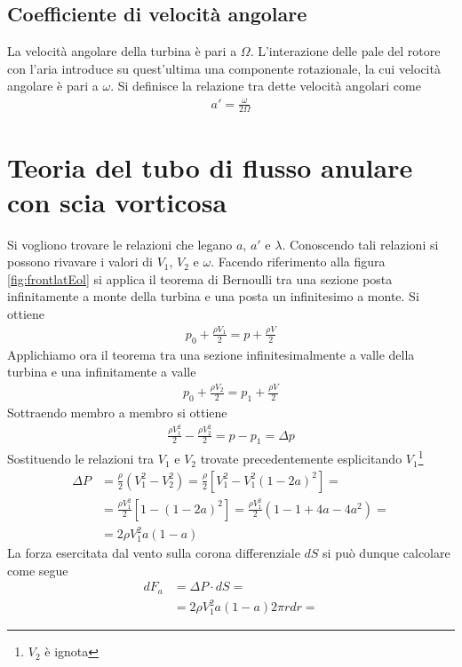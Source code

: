 \subsection{Coefficiente di velocità angolare}
La velocità angolare della turbina è pari a $\Omega$. L'interazione delle pale del rotore con l'aria introduce su quest'ultima una componente rotazionale, la cui velocità angolare è pari a $\omega$. Si definisce la relazione tra dette velocità angolari come 
\begin{align*}
a' = \frac{\omega}{2 \Omega}
\end{align*}

\section{Teoria del tubo di flusso anulare con scia vorticosa}
Si vogliono trovare le relazioni che legano $a$, $a'$ e $\lambda$. Conoscendo tali relazioni si possono rivavare i valori di $V_1$, $V_2$ e $\omega$. 
Facendo riferimento alla figura \ref{fig:frontlatEol} si applica il teorema di Bernoulli tra una sezione posta infinitamente a monte della turbina e una posta un infinitesimo a monte. Si ottiene
\begin{align*}
p_0 + \frac{\rho V_1}{2} = p + \frac{\rho V}{2}
\end{align*}
Applichiamo ora il teorema tra una sezione infinitesimalmente a valle della turbina e una infinitamente a valle\\
\begin{align*}
p_0 + \frac{\rho V_2}{2} = p_1 + \frac{\rho V}{2}
\end{align*}
Sottraendo membro a membro si ottiene
\begin{align*}
\frac{\rho V_1^2}{2} - \frac{\rho V_2^2}{2} = p - p_1 = \Delta p
\end{align*}
Sostituendo le relazioni tra $V_1$ e $V_2$ trovate precedentemente esplicitando $V_1$\footnote{$V_2$ è ignota}
\begin{align*}
\Delta P &= \frac{\rho}{2} \left(V_1^2 - V_2^2 \right) = \frac{\rho}{2} \left[ V_1^2 - V_1^2 \left(1-2a \right)^2 \right]=\\
&= \frac{\rho V_1^2}{2} \left[ 1- \left( 1- 2a \right)^2 \right] = \frac{\rho V_1^2}{2} \left( 1- 1+4a-4a^2 \right)=\\
&= 2 \rho V_1^2 a \left( 1-a \right)
\end{align*}
La forza esercitata dal vento sulla corona differenziale $dS$ si può dunque calcolare come segue
\begin{align*}
dF_a &= \Delta P \cdot dS = \\
&= 2 \rho V_1^2 a \left( 1-a \right) 2 \pi r dr = 
\end{align*}
